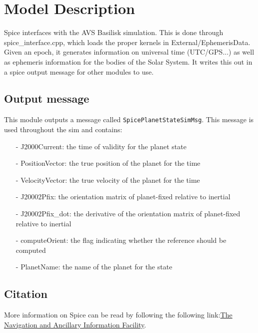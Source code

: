 \section{Model Description}


Spice interfaces with the AVS Basilisk simulation. This is done through spice\_interface.cpp, which loads the proper kernels in External/EphemerisData. Given an epoch, it generates information on universal time (UTC/GPS...) as well as ephemeris information for the bodies of the Solar System. It writes this out in a spice output message for other modules to use.

\subsection{Output message}

This module outputs a message called \texttt{SpicePlanetStateSimMsg}. This message is used throughout the sim and contains:

\begin{itemize}
    \item[-] J2000Current: the time of validity for the planet state
    \item[-] PositionVector: the true position of the planet for the time
    \item[-] VelocityVector: the true velocity of the planet for the time
    \item[-] J20002Pfix: the orientation matrix of planet-fixed relative to inertial
    \item[-] J20002Pfix\_dot: the derivative of the orientation matrix of planet-fixed relative to inertial
    \item[-] computeOrient: the flag indicating whether the reference should be computed
    \item[-] PlanetName: the name of the planet for the state
\end{itemize}

\subsection{Citation}

More information on Spice can be read by following the following link:\href{ \underline{https://naif.jpl.nasa.gov/naif/spiceconcept.html}}{The Navigation and Ancillary Information Facility}. 

